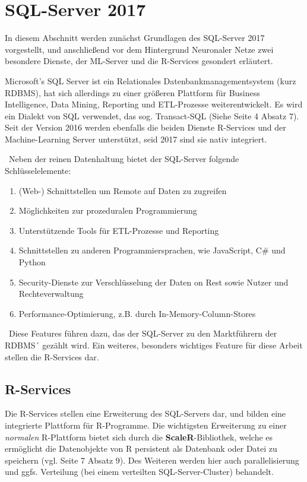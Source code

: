 \section{SQL-Server 2017}
\label{sec:SQLServer}
In diesem Abschnitt werden zunächst Grundlagen des SQL-Server 2017 vorgestellt, und anschließend vor dem Hintergrund Neuronaler Netze zwei besondere Dienste, der ML-Server und die R-Services gesondert erläutert. 

Microsoft’s SQL Server ist ein Relationales Datenbankmanagementsystem (kurz RDBMS), hat sich allerdings zu einer größeren Plattform für Business Intelligence, Data Mining, Reporting und ETL-Prozesse weiterentwickelt. Es wird ein Dialekt von SQL verwendet, das sog. Transact-SQL (Siehe \cite{SQLData} Seite 4 Absatz 7). Seit der Version 2016 werden ebenfalls die beiden Dienste R-Services und der Machine-Learning Server unterstützt, seid 2017 sind sie nativ integriert. 

~\newline Neben der reinen Datenhaltung bietet der SQL-Server folgende Schlüsselelemente:
\begin{enumerate}
	\item (Web-) Schnittstellen um Remote auf Daten zu zugreifen
	\item Möglichkeiten zur prozeduralen Programmierung
	\item Unterstützende Tools für ETL-Prozesse und Reporting
	\item Schnittstellen zu anderen Programmiersprachen, wie JavaScript, C# und Python
	\item Security-Dienste zur Verschlüsselung der Daten on Rest sowie Nutzer und Rechteverwaltung
	\item Performance-Optimierung, z.B. durch In-Memory-Column-Stores
\end{enumerate}

~\newline Diese Features führen dazu, das der SQL-Server zu den Marktführern der RDBMS´ gezählt wird. Ein weiteres, besonders wichtiges Feature für diese Arbeit stellen die R-Services dar.
\subsection{R-Services}
Die R-Services stellen eine Erweiterung des SQL-Servers dar, und bilden eine integrierte Plattform für R-Programme. Die wichtigsten Erweiterung zu einer \textit{normalen} R-Plattform bietet sich durch die \textbf{ScaleR}-Bibliothek, welche es ermöglicht die Datenobjekte von R persistent als Datenbank oder Datei zu speichern (vgl. \cite{SQLData} Seite 7 Absatz 9). Des Weiteren werden hier auch parallelisierung und ggfs. Verteilung (bei einem verteilten SQL-Server-Cluster) behandelt.

